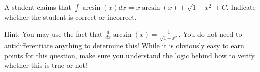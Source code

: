 \documentclass{ximera}
\author{Jim Talamo}
\begin{document}
\begin{exercise}
A student claims that $\int \arcsin(x) dx = x \arcsin(x) + \sqrt{1-x^2}+C$.  Indicate whether the student is correct or incorrect. 

\begin{multipleChoice}  
\end{multipleChoice}

Hint: You may use the fact that $\frac{d}{dx} \arcsin(x) = \frac{1}{\sqrt{1-x^2}}$.  You do not need to antidifferentiate anything to determine this!   While it is obviously easy to earn points for this question, make sure you understand the logic behind how to verify whether this is true or not!
\end{exercise}
\end{document}
